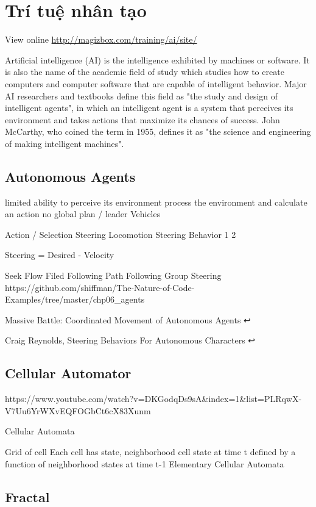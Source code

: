 \chapter{Trí tuệ nhân tạo}

View online \href{http://magizbox.com/training/ai/site/}{http://magizbox.com/training/ai/site/}

Artificial intelligence (AI) is the intelligence exhibited by machines or software. It is also the name of the academic field of study which studies how to create computers and computer software that are capable of intelligent behavior. Major AI researchers and textbooks define this field as "the study and design of intelligent agents", in which an intelligent agent is a system that perceives its environment and takes actions that maximize its chances of success. John McCarthy, who coined the term in 1955, defines it as "the science and engineering of making intelligent machines".

\section{Autonomous Agents}

limited ability to perceive its environment
process the environment and calculate an action
no global plan / leader
Vehicles

Action / Selection
Steering
Locomotion
Steering Behavior 1 2


Steering = Desired - Velocity

Seek
Flow Filed Following
Path Following
Group Steering
https://github.com/shiffman/The-Nature-of-Code-Examples/tree/master/chp06_agents\

Massive Battle: Coordinated Movement of Autonomous Agents ↩

Craig Reynolds, Steering Behaviors For Autonomous Characters ↩

\section{Cellular Automator}

https://www.youtube.com/watch?v=DKGodqDs9sA&index=1&list=PLRqwX-V7Uu6YrWXvEQFOGbCt6cX83Xunm

Cellular Automata

Grid of cell
Each cell has state, neighborhood
cell state at time t defined by a function of neighborhood states at time t-1
Elementary Cellular Automata

\section{Fractal}

